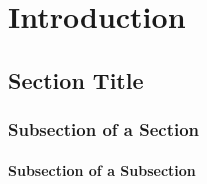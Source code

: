 \chapter{Introduction}

\section{Section Title}

\subsection{Subsection of a Section}

\subsubsection{Subsection of a Subsection}

